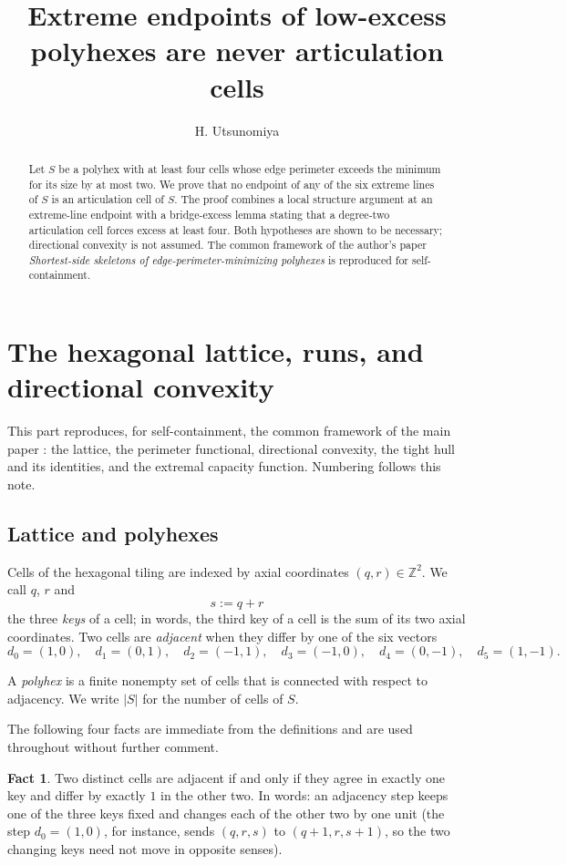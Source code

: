 \documentclass[11pt]{article}
\title{Extreme endpoints of low-excess polyhexes are never articulation cells}
\author{H. Utsunomiya}
\date{}
\theoremstyle{plain}
\theoremstyle{definition}
\newtheorem{fact}[theorem]{Fact}
\theoremstyle{remark}
\newcommand{\Z}{\mathbb{Z}}
\begin{document}
\maketitle
\begin{abstract}
Let \(S\) be a polyhex with at least four cells whose edge perimeter exceeds the minimum
for its size by at most two. We prove that no endpoint of any of the six extreme lines of
\(S\) is an articulation cell of \(S\). The proof combines a local structure argument at
an extreme-line endpoint with a bridge-excess lemma stating that a degree-two articulation
cell forces excess at least four. Both hypotheses are shown to be necessary; directional
convexity is not assumed. The common framework of the author's paper \emph{Shortest-side
skeletons of edge-perimeter-minimizing polyhexes} is reproduced for self-containment.
\end{abstract}

\section{The hexagonal lattice, runs, and directional convexity}\label{sec:prelim}

This part reproduces, for self-containment, the common framework of the main paper
\cite{UtsunomiyaCSGMain}:
the lattice, the perimeter functional, directional convexity, the tight hull and its
identities, and the extremal capacity function. Numbering follows this note.

\subsection{Lattice and polyhexes}\label{sec:2.1}

Cells of the hexagonal tiling are indexed by axial coordinates
\((q,r)\in\Z^{2}\). We call \(q\), \(r\) and
\[
   s:=q+r
\]
the three \emph{keys} of a cell; in words, the third key of a cell is the sum of its two
axial coordinates. Two cells are \emph{adjacent} when they differ by one of the six
vectors
\[
   d_{0}=(1,0),\quad d_{1}=(0,1),\quad d_{2}=(-1,1),\quad
   d_{3}=(-1,0),\quad d_{4}=(0,-1),\quad d_{5}=(1,-1).
\]

A \emph{polyhex} is a finite nonempty set of cells that is connected with respect to
adjacency. We write \(|S|\) for the number of cells of \(S\).

The following four facts are immediate from the definitions and are used throughout
without further comment.

\begin{fact}\label{f:1}
Two distinct cells are adjacent if and only if they agree in exactly one key and differ
by exactly \(1\) in the other two. In words: an adjacency step keeps one of the three
keys fixed and changes each of the other two by one unit (the step \(d_{0}=(1,0)\), for
instance, sends \((q,r,s)\) to \((q+1,r,s+1)\), so the two changing keys need not move
in opposite senses).
\end{fact}
\end{document}
